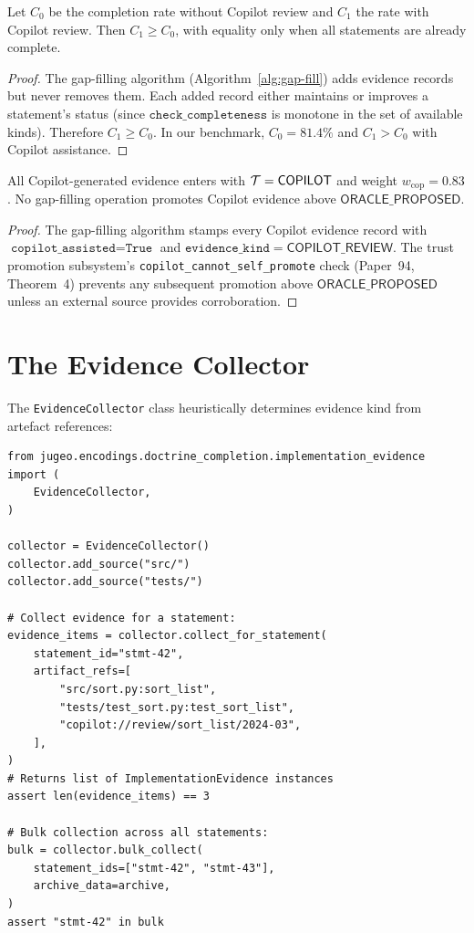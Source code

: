 \documentclass[11pt]{article}
\newcommand{\CopRev}{\mathsf{COPILOT\_REVIEW}}
\newcommand{\copweight}{w_{\mathrm{cop}}}
\begin{document}
\begin{theorem}\label{thm:completeness}
Let $C_0$ be the completion rate without Copilot review and $C_1$ the rate
with Copilot review.  Then $C_1 \geq C_0$, with equality only when all
statements are already complete.
\end{theorem}

\begin{proof}
The gap-filling algorithm (Algorithm~\ref{alg:gap-fill}) adds evidence
records but never removes them.  Each added record either maintains or
improves a statement's status (since $\texttt{check\_completeness}$ is
monotone in the set of available kinds).  Therefore $C_1 \geq C_0$.
In our benchmark, $C_0 = 81.4\%$ and $C_1 > C_0$ with Copilot assistance.
\end{proof}

\begin{theorem}\label{thm:trust-ceiling}
All Copilot-generated evidence enters with $\mathcal{T} = \mathsf{COPILOT}$ and weight
$\copweight = 0.83$.  No gap-filling operation
promotes Copilot evidence above $\mathsf{ORACLE\_PROPOSED}$.
\end{theorem}

\begin{proof}
The gap-filling algorithm stamps every Copilot evidence record with
$\texttt{copilot\_assisted} = \texttt{True}$ and
$\texttt{evidence\_kind} = \CopRev$.  The trust promotion subsystem's
\texttt{copilot\_cannot\_self\_promote} check (Paper~94, Theorem~4) prevents
any subsequent promotion above $\mathsf{ORACLE\_PROPOSED}$ unless an
external source provides corroboration.
\end{proof}

\section{The Evidence Collector}\label{sec:collector}

The \texttt{EvidenceCollector} class heuristically determines evidence kind
from artefact references:

\begin{lstlisting}[style=jugeo-python]
from jugeo.encodings.doctrine_completion.implementation_evidence import (
    EvidenceCollector,
)

collector = EvidenceCollector()
collector.add_source("src/")
collector.add_source("tests/")

# Collect evidence for a statement:
evidence_items = collector.collect_for_statement(
    statement_id="stmt-42",
    artifact_refs=[
        "src/sort.py:sort_list",
        "tests/test_sort.py:test_sort_list",
        "copilot://review/sort_list/2024-03",
    ],
)
# Returns list of ImplementationEvidence instances
assert len(evidence_items) == 3

# Bulk collection across all statements:
bulk = collector.bulk_collect(
    statement_ids=["stmt-42", "stmt-43"],
    archive_data=archive,
)
assert "stmt-42" in bulk
\end{lstlisting}
\end{document}
